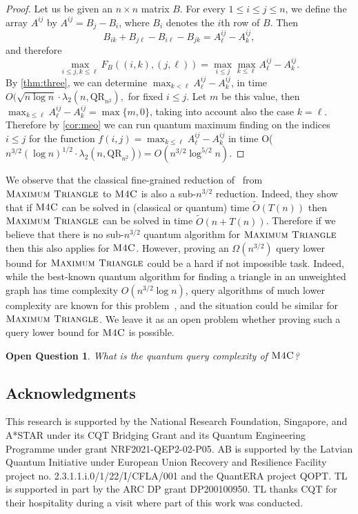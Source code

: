 \documentclass[12pt]{article}
\newcommand{\qr}{\mathrm{QR}}
\newcommand{\MaxT}{\textsc{Maximum Triangle}}
\newcommand{\MaxFourC}{\textsc{M4C}}
\newtheorem{openq}{Open Question}
\theoremstyle{definition}
\begin{document}
\begin{proof}
Let us be given an $n \times n$ matrix $B$. 
For every $1 \leq i  \leq j \leq n$, we define the array $A^{ij}$ by $A^{ij} = B_{j} - B_{i}$, where $B_{i}$ denotes the $i$th row of $B$.
Then
$$
B_{ik} + B_{j \ell} - B_{i \ell} - B_{jk} = A^{ij}_{\ell} - A^{ij}_k,
$$
and therefore 
$$
\max_{i \leq j, k \leq  \ell } F_B((i,k),(j,\ell)) = \max_{i \leq j} \max_{k \leq \ell } A^{ij}_{\ell} - A^{ij}_k.
$$
By \cref{thm:three}, we can determine $\max_{k < \ell } A^{ij}_{\ell} - A^{ij}_k$, in time $O(\sqrt{n\log n}\cdot\lambda_2(n,\qr_{n^2}),$ for  fixed $i \leq j$.   
Let $m$ be this value, then $\max_{k \leq \ell } A^{ij}_{\ell} - A^{ij}_k = \max\{m,0\}$, taking into account also the case
$k=\ell$.
Therefore by \cref{cor:meo} we can run quantum maximum finding on the indices $i \leq j$ for the function $f(i,j) = \max_{k \leq \ell } A^{ij}_{\ell} - A^{ij}_k$ in time O($n^{3/2}(\log n)^{1/2}\cdot \lambda_2(n,\qr_{n^2})) = O(n^{3/2}\log^{5/2}n)$.
\end{proof}


We observe that the classical fine-grained reduction of~\cite{BDT16} from $\MaxT$ to $\MaxFourC$ is also a sub-$n^{3/2}$ reduction.
Indeed, they show that if $\MaxFourC$  can be solved in (classical or quantum) time $\widetilde{O}(T(n))$ then $\MaxT$ can be solved in time $\widetilde{O}(n +T(n))$.
Therefore if we believe that there is no sub-$n^{3/2}$ quantum algorithm for $\MaxT$ then this also applies for $\MaxFourC$. However, proving an $\Omega (n^{3/2})$ query lower bound for $\MaxT$ could be a hard if not impossible task. Indeed, while the best-known quantum algorithm for finding a triangle in an unweighted graph has time complexity $O(n^{3/2} \log n)$, query algorithms of much lower complexity are known for this problem~\cite{MSS07, Bel12, LMS17, Gall14}, and the situation could be similar for $\MaxT$. 
We leave it as an open problem whether proving such a query lower bound for $\MaxFourC$ is possible.

\begin{openq}
What is the quantum query complexity of $\MaxFourC$?
\end{openq}

\subsection*{Acknowledgments}
This research is supported by the National Research Foundation, Singapore, and A*STAR under its CQT Bridging Grant and its Quantum Engineering Programme under grant NRF2021-QEP2-02-P05. AB is supported by the Latvian Quantum Initiative under European Union Recovery and Resilience Facility project no. 2.3.1.1.i.0/1/22/I/CFLA/001 and the QuantERA project QOPT.
TL is supported in part by the ARC DP grant DP200100950.  TL thanks CQT for their hospitality during a visit where part of this work was conducted.


\end{document}
